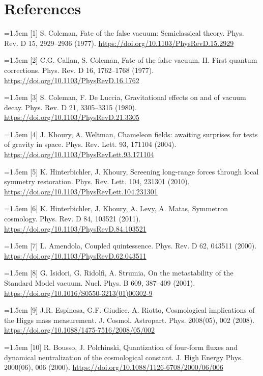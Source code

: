 \documentclass[preprint,12pt]{elsarticle}
\begin{document}
\section*{References}
\noindent\hangindent=1.5em [1] S. Coleman, Fate of the false vacuum: Semiclassical theory. Phys. Rev. D 15, 2929--2936 (1977). \url{https://doi.org/10.1103/PhysRevD.15.2929}\par
\noindent\hangindent=1.5em [2] C.G. Callan, S. Coleman, Fate of the false vacuum. II. First quantum corrections. Phys. Rev. D 16, 1762--1768 (1977). \url{https://doi.org/10.1103/PhysRevD.16.1762}\par
\noindent\hangindent=1.5em [3] S. Coleman, F. De Luccia, Gravitational effects on and of vacuum decay. Phys. Rev. D 21, 3305--3315 (1980). \url{https://doi.org/10.1103/PhysRevD.21.3305}\par
\noindent\hangindent=1.5em [4] J. Khoury, A. Weltman, Chameleon fields: awaiting surprises for tests of gravity in space. Phys. Rev. Lett. 93, 171104 (2004). \url{https://doi.org/10.1103/PhysRevLett.93.171104}\par
\noindent\hangindent=1.5em [5] K. Hinterbichler, J. Khoury, Screening long-range forces through local symmetry restoration. Phys. Rev. Lett. 104, 231301 (2010). \url{https://doi.org/10.1103/PhysRevLett.104.231301}\par
\noindent\hangindent=1.5em [6] K. Hinterbichler, J. Khoury, A. Levy, A. Matas, Symmetron cosmology. Phys. Rev. D 84, 103521 (2011). \url{https://doi.org/10.1103/PhysRevD.84.103521}\par
\noindent\hangindent=1.5em [7] L. Amendola, Coupled quintessence. Phys. Rev. D 62, 043511 (2000). \url{https://doi.org/10.1103/PhysRevD.62.043511}\par
\noindent\hangindent=1.5em [8] G. Isidori, G. Ridolfi, A. Strumia, On the metastability of the Standard Model vacuum. Nucl. Phys. B 609, 387--409 (2001). \url{https://doi.org/10.1016/S0550-3213(01)00302-9}\par
\noindent\hangindent=1.5em [9] J.R. Espinosa, G.F. Giudice, A. Riotto, Cosmological implications of the Higgs mass measurement. J. Cosmol. Astropart. Phys. 2008(05), 002 (2008). \url{https://doi.org/10.1088/1475-7516/2008/05/002}\par
\noindent\hangindent=1.5em [10] R. Bousso, J. Polchinski, Quantization of four-form fluxes and dynamical neutralization of the cosmological constant. J. High Energy Phys. 2000(06), 006 (2000). \url{https://doi.org/10.1088/1126-6708/2000/06/006}\par
\end{document}
